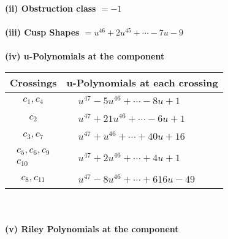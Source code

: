 \documentclass[1p]{elsarticle_modified}
\theoremstyle{definition}
\begin{document}
\flushleft \textbf{(ii) Obstruction class $= -1$}\\~\\
\flushleft \textbf{(iii) Cusp Shapes $= u^{46}+2 u^{45}+\cdots-7 u-9$}\\~\\
\newpage\renewcommand{\arraystretch}{1}
\flushleft \textbf{(iv) u-Polynomials at the component}\newline \\
\begin{tabular}{m{50pt}|m{274pt}}
Crossings & \hspace{64pt}u-Polynomials at each crossing \\
\hline $$\begin{aligned}c_{1},c_{4}\end{aligned}$$&$\begin{aligned}
&u^{47}-5 u^{46}+\cdots-8 u+1
\end{aligned}$\\
\hline $$\begin{aligned}c_{2}\end{aligned}$$&$\begin{aligned}
&u^{47}+21 u^{46}+\cdots-6 u+1
\end{aligned}$\\
\hline $$\begin{aligned}c_{3},c_{7}\end{aligned}$$&$\begin{aligned}
&u^{47}+u^{46}+\cdots+40 u+16
\end{aligned}$\\
\hline $$\begin{aligned}c_{5},c_{6},c_{9}\\c_{10}\end{aligned}$$&$\begin{aligned}
&u^{47}+2 u^{46}+\cdots+4 u+1
\end{aligned}$\\
\hline $$\begin{aligned}c_{8},c_{11}\end{aligned}$$&$\begin{aligned}
&u^{47}-8 u^{46}+\cdots+616 u-49
\end{aligned}$\\
\hline
\end{tabular}\\~\\
\newpage\renewcommand{\arraystretch}{1}
\flushleft \textbf{(v) Riley Polynomials at the component}\newline \\
\end{document}

